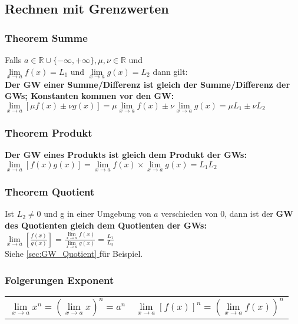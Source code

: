 \documentclass[../main.tex]{subfiles}
\begin{document}
\subsection{Rechnen mit Grenzwerten}
\subsubsection{Theorem Summe}
Falls $a \in \mathbb{R} \cup \{ -\infty, +\infty\}, \mu,\nu \in \mathbb{R}$ und \\ [7pt]
$\lim\limits_{x\to a} f(x) = L_1$ und $\lim\limits_{x\to a} g(x) = L_2$ dann gilt: \\ [14pt]

\textbf{Der GW einer Summe/Differenz ist gleich der Summe/Differenz der GWs; Konstanten kommen vor den GW:} \\ [7pt]
$\lim\limits_{x\to a}[\mu f(x) \pm \nu g(x)] = \mu \lim\limits_{x\to a} f(x) \pm \nu \lim\limits_{x\to a} g(x) = \mu L_1 \pm \nu L_2$

\subsubsection{Theorem Produkt}
\textbf{Der GW eines Produkts ist gleich dem Produkt der GWs:} \\ [7pt]
$\lim\limits_{x\to a}[f(x)g(x)] = \lim\limits_{x\to a} f(x) \times \lim\limits_{x\to a} g(x) = L_1L_2$

\subsubsection{Theorem Quotient}
Ist $L_2 \neq 0$ und g in einer Umgebung von $a$ verschieden von $0$, dann ist der \textbf{GW des Quotienten gleich dem Quotienten der GWs:} \\ [7pt]
$\lim\limits_{x\to a}[\frac{f(x)}{g(x)}] = \frac{\lim\limits_{x\to a}f(x)}{\lim\limits_{x\to a}g(x)} = \frac{L_1}{L_2}$ \\ [7pt]
Siehe \hyperref[sec:GW_Quotient]{\ref{sec:GW_Quotient} } für Beispiel.


\subsubsection{Folgerungen Exponent}
\begin{tabularx}{0.8\textwidth} { 
    >{\centering\arraybackslash}X 
    >{\centering\arraybackslash}X  }
    \begin{math}
        \lim\limits_{x\to a} x^n = (\lim\limits_{x\to a} x)^n = a^n
    \end{math}
    &
    \begin{math}
        \lim\limits_{x\to a} [f(x)]^n = (\lim\limits_{x\to a} f(x))^n
    \end{math}
\end{tabularx}
\end{document}
